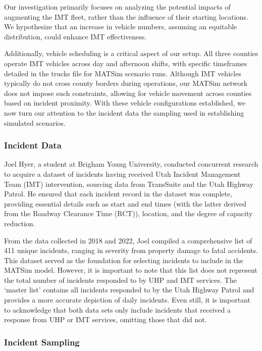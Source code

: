 \documentclass[
  letterpaper,
  authoryear]{elsarticle}
\begin{document}
Our investigation primarily focuses on analyzing the potential impacts
of augmenting the IMT fleet, rather than the influence of their starting
locations. We hypothesize that an increase in vehicle numbers, assuming
an equitable distribution, could enhance IMT effectiveness.

Additionally, vehicle scheduling is a critical aspect of our setup. All
three counties operate IMT vehicles across day and afternoon shifts,
with specific timeframes detailed in the trucks file for MATSim scenario
runs. Although IMT vehicles typically do not cross county borders during
operations, our MATSim network does not impose such constraints,
allowing for vehicle movement across counties based on incident
proximity. With these vehicle configurations established, we now turn
our attention to the incident data the sampling used in establishing
simulated scenarios.

\hypertarget{incident-data}{%
\subsubsection{Incident Data}\label{incident-data}}

Joel Hyer, a student at Brigham Young University, conducted concurrent
research to acquire a dataset of incidents having received Utah Incident
Management Team (IMT) intervention, sourcing data from TransSuite and
the Utah Highway Patrol. He ensured that each incident record in the
dataset was complete, providing essential details such as start and end
times (with the latter derived from the Roadway Clearance Time (RCT)),
location, and the degree of capacity reduction.

From the data collected in 2018 and 2022, Joel compiled a comprehensive
list of 411 unique incidents, ranging in severity from property damage
to fatal accidents. This dataset served as the foundation for selecting
incidents to include in the MATSim model. However, it is important to
note that this list does not represent the total number of incidents
responded to by UHP and IMT services. The `master list' contains all
incidents responded to by the Utah Highway Patrol and provides a more
accurate depiction of daily incidents. Even still, it is important to
acknowledge that both data sets only include incidents that received a
response from UHP or IMT services, omitting those that did not.

\hypertarget{incident-sampling}{%
\subsubsection{Incident Sampling}\label{incident-sampling}}
\end{document}
